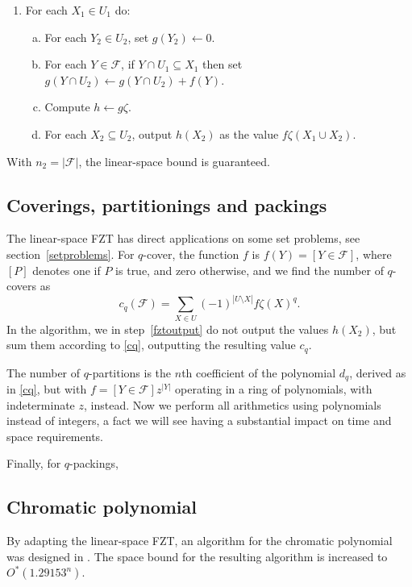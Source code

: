 \documentclass{cslthse-msc}
\begin{document}
\begin{enumerate}[1.]
 \item For each $X_1 \in U_1$ do:
 \begin{enumerate}[a)]
  \item For each $Y_2 \in U_2$, set $g(Y_2) \leftarrow 0$.
  \item For each $Y \in \mathcal{F}$, if $Y \cap U_1 \subseteq X_1$ then set $g(Y \cap U_2) \leftarrow g(Y \cap U_2) + f(Y)$.
  \item Compute $h \leftarrow g\zeta$.
  \item For each $X_2 \subseteq U_2$, output $h(X_2)$ as the value $f\zeta(X_1 \cup X_2)$. \label{fztoutput}
 \end{enumerate}
\end{enumerate}
With $n_2 = |\mathcal{F}|$, the linear-space bound is guaranteed.

\subsection{Coverings, partitionings and packings}
The linear-space FZT has direct applications on some set problems, see section~\ref{setproblems}. For $q$-cover, the function $f$ is $f(Y) = [ Y \in \mathcal{F} ]$, where $[P]$ denotes one if $P$ is true, and zero otherwise, and we find the number of $q$-covers as 
\begin{equation} \label{cq}
c_q(\mathcal{F}) = \sum_{X \in U} (-1)^{|U \setminus X|} f\zeta(X)^q.
\end{equation}
In the algorithm, we in step~\ref{fztoutput} do not output the values $h(X_2)$, but sum them according to \ref{cq}, outputting the resulting value $c_q$.

The number of $q$-partitions is the $n$th coefficient of the polynomial $d_q$, derived as in \ref{cq}, but with $f = [Y \in \mathcal{F}]z^{|Y|}$ operating in a ring of polynomials, with indeterminate $z$, instead. Now we perform all arithmetics using polynomials instead of integers, a fact we will see having a substantial impact on time and space requirements.

Finally, for $q$-packings, 


\subsection{Chromatic polynomial}
By adapting the linear-space FZT, an algorithm for the chromatic polynomial was designed in \cite{cov_pack}. The space bound for the resulting algorithm is increased to $O^*(1.29153^n)$.
\end{document}
